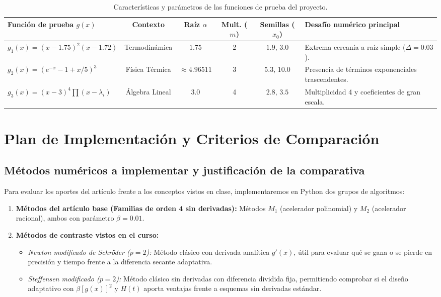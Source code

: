 ﻿\documentclass[10pt, a4paper]{article}
\begin{document}
\begin{table}[htbp]
    \centering
    \small
    \caption{Características y parámetros de las funciones de prueba del proyecto.}
    \label{tab:problemas}
    \begin{tabularx}{\textwidth}{p{4.2cm} c c c c X}
        \toprule
        \textbf{Función de prueba $g(x)$} & \textbf{Contexto} & \textbf{Raíz $\alpha$} & \textbf{Mult. ($m$)} & \textbf{Semillas ($x_0$)} & \textbf{Desafío numérico principal} \\
        \midrule
        $g_1(x) = (x-1.75)^2(x-1.72)$ & Termodinámica & $1.75$ & 2 & $1.9, \, 3.0$ & Extrema cercanía a raíz simple ($\Delta=0.03$). \\
        $g_2(x) = (e^{-x} - 1 + x/5)^3$ & Física Térmica & $\approx 4.96511$ & 3 & $5.3, \, 10.0$ & Presencia de términos exponenciales trascendentes. \\
        $g_3(x) = (x-3)^4 \prod(x - \lambda_i)$ & Álgebra Lineal & $3.0$ & 4 & $2.8, \, 3.5$ & Multiplicidad 4 y coeficientes de gran escala. \\
        \bottomrule
    \end{tabularx}
\end{table}

\section{Plan de Implementación y Criterios de Comparación}

\subsection{Métodos numéricos a implementar y justificación de la comparativa}
Para evaluar los aportes del artículo frente a los conceptos vistos en clase, implementaremos en Python dos grupos de algoritmos:
\begin{enumerate}
    \item \textbf{Métodos del artículo base (Familias de orden 4 sin derivadas):} Métodos $M_1$ (acelerador polinomial) y $M_2$ (acelerador racional), ambos con parámetro $\beta = 0.01$.
    \item \textbf{Métodos de contraste vistos en el curso:}
    \begin{itemize}
        \item \textit{Newton modificado de Schröder ($p=2$):} Método clásico con derivada analítica $g'(x)$, útil para evaluar qué se gana o se pierde en precisión y tiempo frente a la diferencia secante adaptativa.
        \item \textit{Steffensen modificado ($p=2$):} Método clásico sin derivadas con diferencia dividida fija, permitiendo comprobar si el diseño adaptativo con $\beta [g(x)]^2$ y $H(t)$ aporta ventajas frente a esquemas sin derivadas estándar.
    \end{itemize}
\end{enumerate}
\end{document}
